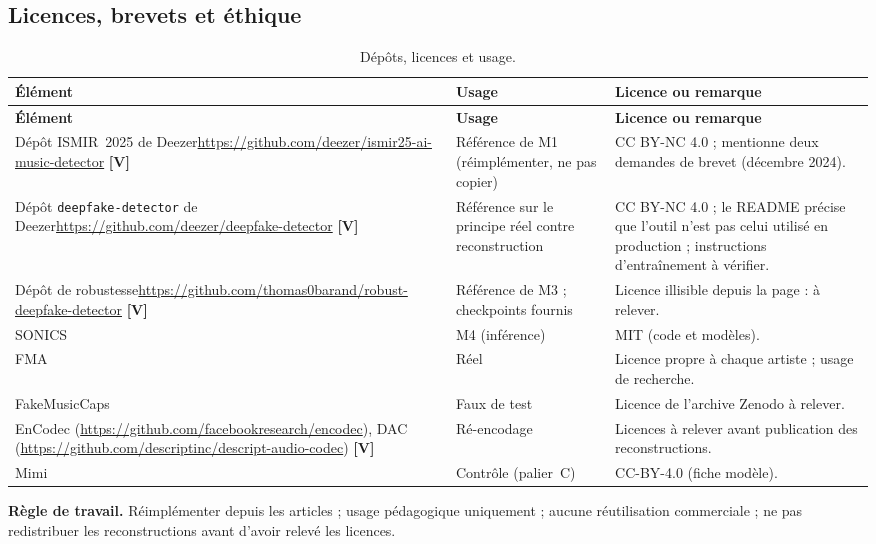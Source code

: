\documentclass[11pt,a4paper]{article}
\newcommand{\sV}{\textbf{[V]}}
\begin{document}
\subsection{Licences, brevets et éthique}

{\small
\begin{longtable}{L{4.1cm}L{4.6cm}L{5.7cm}}
\caption{Dépôts, licences et usage.}\label{tab:licences}\\
\toprule
\textbf{Élément} & \textbf{Usage} & \textbf{Licence ou remarque}\\
\midrule
\endfirsthead
\toprule
\textbf{Élément} & \textbf{Usage} & \textbf{Licence ou remarque}\\
\midrule
\endhead
\bottomrule
\endfoot
Dépôt ISMIR~2025 de Deezer\newline \url{https://github.com/deezer/ismir25-ai-music-detector} \sV & Référence de M1 (réimplémenter, ne pas copier) & CC BY-NC 4.0 ; mentionne deux demandes de brevet (décembre 2024).\\
Dépôt \texttt{deepfake-detector} de Deezer\newline \url{https://github.com/deezer/deepfake-detector} \sV & Référence sur le principe réel contre reconstruction & CC BY-NC 4.0 ; le README précise que l'outil n'est pas celui utilisé en production ; instructions d'entraînement à vérifier.\\
Dépôt de robustesse\newline \url{https://github.com/thomas0barand/robust-deepfake-detector} \sV & Référence de M3 ; checkpoints fournis & Licence illisible depuis la page : à relever.\\
SONICS & M4 (inférence) & MIT (code et modèles).\\
FMA & Réel & Licence propre à chaque artiste ; usage de recherche.\\
FakeMusicCaps & Faux de test & Licence de l'archive Zenodo à relever.\\
EnCodec (\url{https://github.com/facebookresearch/encodec}), DAC (\url{https://github.com/descriptinc/descript-audio-codec}) \sV & Ré-encodage & Licences à relever avant publication des reconstructions.\\
Mimi & Contrôle (palier~C) & CC-BY-4.0 (fiche modèle).\\
\end{longtable}
}

\textbf{Règle de travail.} Réimplémenter depuis les articles ; usage pédagogique uniquement ; aucune réutilisation commerciale ; ne pas redistribuer les reconstructions avant d'avoir relevé les licences.
\end{document}
